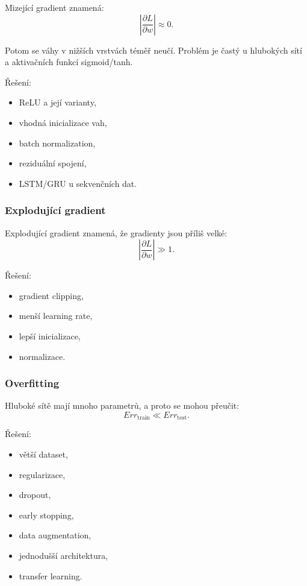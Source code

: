 Mizející gradient znamená:
\[
\left|
\frac{\partial L}{\partial w}
\right|
\approx 0.
\]

Potom se váhy v nižších vrstvách téměř neučí. Problém je častý u hlubokých sítí a aktivačních funkcí
sigmoid/tanh.

Řešení:
\begin{itemize}
    \item ReLU a její varianty,
    \item vhodná inicializace vah,
    \item batch normalization,
    \item reziduální spojení,
    \item LSTM/GRU u sekvenčních dat.
\end{itemize}

\subsubsection{Explodující gradient}

Explodující gradient znamená, že gradienty jsou příliš velké:
\[
\left|
\frac{\partial L}{\partial w}
\right|
\gg 1.
\]

Řešení:
\begin{itemize}
    \item gradient clipping,
    \item menší learning rate,
    \item lepší inicializace,
    \item normalizace.
\end{itemize}

\subsubsection{Overfitting}

Hluboké sítě mají mnoho parametrů, a proto se mohou přeučit:
\[
Err_{\text{train}} \ll Err_{\text{test}}.
\]

Řešení:
\begin{itemize}
    \item větší dataset,
    \item regularizace,
    \item dropout,
    \item early stopping,
    \item data augmentation,
    \item jednodušší architektura,
    \item transfer learning.
\end{itemize}

